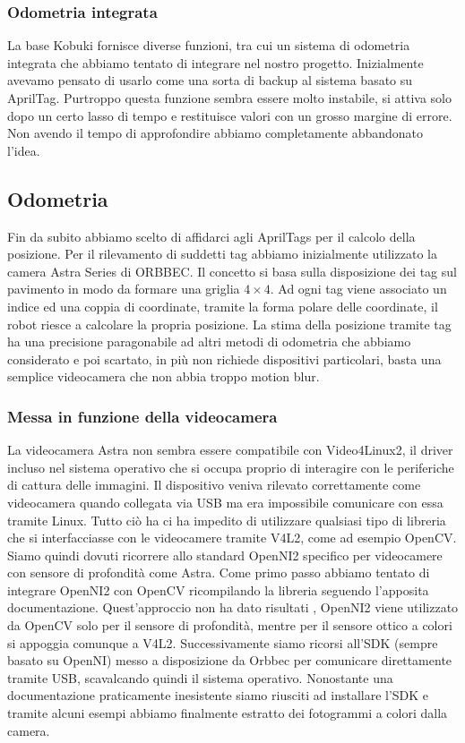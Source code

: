 \documentclass[]{article}
\begin{document}
\subsubsection{Odometria integrata}
La base Kobuki fornisce diverse funzioni, tra cui un sistema di odometria integrata che abbiamo tentato di integrare nel nostro progetto. Inizialmente avevamo pensato di usarlo come una sorta di backup al sistema basato su AprilTag.
Purtroppo questa funzione sembra essere molto instabile, si attiva solo dopo un certo lasso di tempo e restituisce valori con un grosso margine di errore.
Non avendo il tempo di approfondire abbiamo completamente abbandonato l'idea.


\subsection{Odometria}
Fin da subito abbiamo scelto di affidarci agli AprilTags per il calcolo della posizione. Per il rilevamento di suddetti tag abbiamo inizialmente utilizzato la camera Astra Series di ORBBEC.
Il concetto si basa sulla disposizione dei tag sul pavimento in modo da formare una griglia $4 \times 4$. Ad ogni tag viene associato un indice ed una coppia di coordinate, tramite la forma polare delle coordinate, il robot riesce a calcolare la propria posizione.
La stima della posizione tramite tag ha una precisione paragonabile ad altri metodi di odometria che abbiamo considerato e poi scartato, in più non richiede dispositivi particolari, basta una semplice videocamera che non abbia troppo motion blur.

\subsubsection{Messa in funzione della videocamera}

La videocamera Astra non sembra essere compatibile con Video4Linux2, il driver incluso nel sistema operativo che si occupa proprio di interagire con le periferiche di cattura delle immagini.
Il dispositivo veniva rilevato correttamente come videocamera quando collegata via USB ma era impossibile comunicare con essa tramite Linux.
Tutto ciò ha ci ha impedito di utilizzare qualsiasi tipo di libreria che si interfacciasse con le videocamere tramite V4L2, come ad esempio OpenCV.
Siamo quindi dovuti ricorrere allo standard OpenNI2 \cite{opencvopenni} specifico per videocamere con sensore di profondità come Astra.
Come primo passo abbiamo tentato di integrare OpenNI2 con OpenCV \cite{opencvastra} ricompilando la libreria seguendo l'apposita documentazione. Quest'approccio non ha dato risultati
, OpenNI2 viene utilizzato da OpenCV solo per il sensore di profondità, mentre per il sensore ottico a colori si appoggia comunque a V4L2.
Successivamente siamo ricorsi all'SDK (sempre basato su OpenNI) \cite{orbeccsdk} messo a disposizione da Orbbec per comunicare direttamente tramite USB, scavalcando quindi il sistema operativo.
Nonostante una documentazione praticamente inesistente siamo riusciti ad installare l'SDK e tramite alcuni esempi abbiamo finalmente estratto dei fotogrammi a colori dalla camera.
\end{document}
